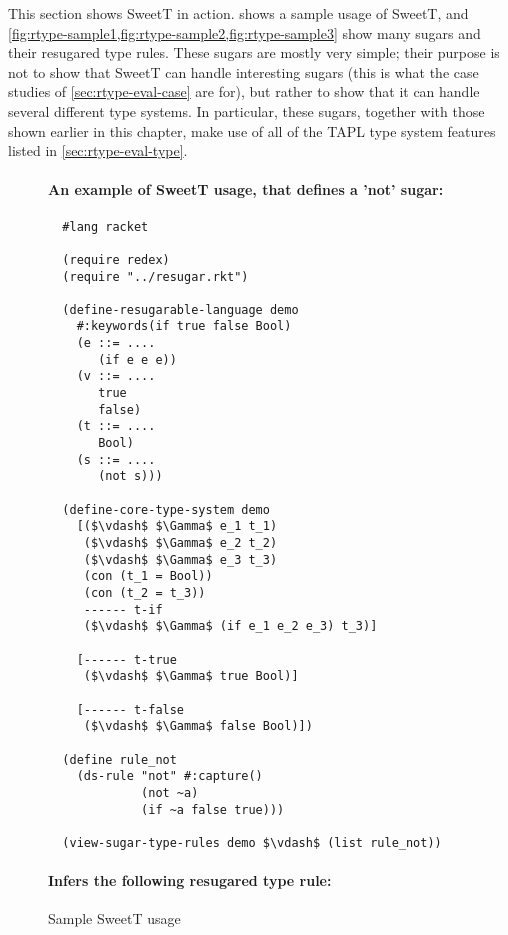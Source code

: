 This section shows SweetT in action.  shows a sample
usage of SweetT, and \cref{fig:rtype-sample1,fig:rtype-sample2,fig:rtype-sample3} show
many sugars and their resugared type rules. These sugars are mostly
very simple; their purpose is not to show that SweetT can handle
interesting sugars (this is what the case studies of
\cref{sec:rtype-eval-case} are for), but rather to show that it can handle
several different type systems. In particular, these sugars, together
with those shown earlier in this chapter, make use of all of the TAPL type
system features listed in \cref{sec:rtype-eval-type}.
\begin{figure*}[h!]
\paragraph{An example of SweetT usage, that defines a 'not' sugar:}
\begin{lstlisting}
  #lang racket

  (require redex)
  (require "../resugar.rkt")
  
  (define-resugarable-language demo
    #:keywords(if true false Bool)
    (e ::= ....
       (if e e e))
    (v ::= ....
       true
       false)
    (t ::= ....
       Bool)
    (s ::= ....
       (not s)))
  
  (define-core-type-system demo
    [($\vdash$ $\Gamma$ e_1 t_1)
     ($\vdash$ $\Gamma$ e_2 t_2)
     ($\vdash$ $\Gamma$ e_3 t_3)
     (con (t_1 = Bool))
     (con (t_2 = t_3))
     ------ t-if
     ($\vdash$ $\Gamma$ (if e_1 e_2 e_3) t_3)]
  
    [------ t-true
     ($\vdash$ $\Gamma$ true Bool)]
  
    [------ t-false
     ($\vdash$ $\Gamma$ false Bool)])
  
  (define rule_not
    (ds-rule "not" #:capture()
             (not ~a)
             (if ~a false true)))
  
  (view-sugar-type-rules demo $\vdash$ (list rule_not))
\end{lstlisting}
\paragraph{Infers the following resugared type rule:}

\caption{Sample SweetT usage}\label{fig:rtype-demo}
\end{figure*}


